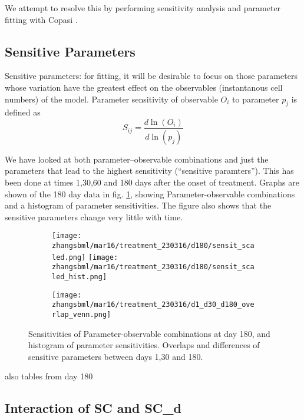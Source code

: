 \documentclass[a4paper,10pt]{report}
\newcommand{\psortbase}{/home/ngrs2/work/bsu/PSORT_Zuliani_Reynolds/}
\newcommand{\sbmlbase}{\psortbase/sbml-sh/}
\newcommand{\zhangsbml}{\sbmlbase/zhang_model}
\begin{document}
We attempt to resolve this by performing sensitivity analysis and parameter fitting  with Copasi \cite{hoops2006copasi,mendes2009computational}. 


\subsection{Sensitive Parameters}\label{sec:zparamsensit}

Sensitive parameters: for fitting, it will be desirable to focus on those
parameters whose variation have the greatest effect on the observables 
(instantanous cell numbers) of the model. Parameter sensitivity of observable $O_i$ to parameter $p_j$ is defined as 
\[
S_{ij} = \frac{d \ln(O_i)}{d \ln(p_j)}
\]


We have looked at both parameter--observable combinations and just the parameters that lead to the highest sensitivity (``sensitive paramters''). This has been done at times 1,30,60 and 180 days after the onset of treatment. Graphs are shown of the 180 day data in fig. \ref{fig:param_sensit_day180}, showing Parameter-observable combinations and a histogram of parameter sensitivities. The figure also shows that the sensitive parameters change very little with time. 

\begin{figure}[h!]
  \begin{subfigure}{\textwidth}
    \texttt{[image: \\zhangsbml/mar16/treatment\_230316/d180/sensit\_scaled.png]}
    \texttt{[image: \\zhangsbml/mar16/treatment\_230316/d180/sensit\_scaled\_hist.png]}
  \end{subfigure}
  \begin{subfigure}{\textwidth}
    \texttt{[image: \\zhangsbml/mar16/treatment\_230316/d1\_d30\_d180\_overlap\_venn.png]}
  \end{subfigure}
  \caption{Sensitivities of Parameter-observable combinations at day 180, and histogram of parameter sensitivities. Overlaps and differences of sensitive parameters between days 1,30 and 180.}
  \label{fig:param_sensit_day180}
\end{figure}


also tables from day 180 %


\subsection{Interaction of SC and SC\_d}\label{sec:zsc_scd}
\end{document}
